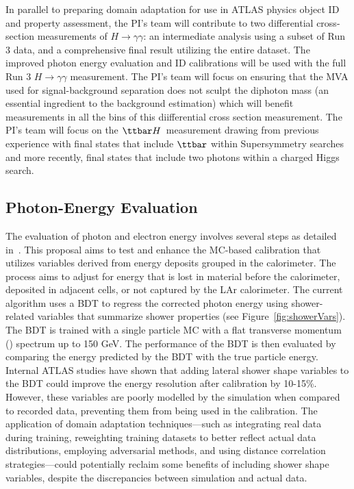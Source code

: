 \documentclass[letter, USenglish, 11pt, subfigure]{article}
\newcommand{\tth}{\ensuremath{\ttbar H}}
\begin{document}
In parallel to preparing domain adaptation for use in ATLAS physics object ID and property assessment, the PI's team will contribute to two differential cross-section measurements of $H\to\gamma\gamma$: an intermediate analysis using a subset of Run 3 data, and a comprehensive final result utilizing the entire dataset. The improved photon energy evaluation and ID calibrations will be used with the full Run 3 $H\to\gamma\gamma$ measurement. The PI's team will focus on ensuring that the MVA used for signal-background separation does not sculpt the diphoton mass (an essential ingredient to the background estimation) which will benefit measurements in all the bins of this diifferential cross section measurement. The PI's team will focus on the \tth\ measurement drawing from previous experience with final states that include $\ttbar$ within Supersymmetry searches and more recently, final states that include two photons within a charged Higgs search. 


\subsection{Photon-Energy Evaluation}

The evaluation of photon and electron energy involves several steps as detailed in~\cite{atlascollaboration2023electron}. This proposal aims to test and enhance the MC-based calibration that utilizes variables derived from energy deposits grouped in the calorimeter. The process aims to adjust for energy that is lost in material before the calorimeter, deposited in adjacent cells, or not captured by the LAr calorimeter. The current algorithm uses a BDT to regress the corrected photon energy using shower-related variables that summarize shower properties (see Figure~\ref{fig:showerVars}). The BDT is trained with a single particle MC with a flat transverse momentum (\pt) spectrum up to 150 GeV. The performance of the BDT is then evaluated by comparing the energy predicted by the BDT with the true particle energy. Internal ATLAS studies have shown that adding lateral shower shape variables to the BDT could improve the energy resolution after calibration by 10-15\%. However, these variables are poorly modelled by the simulation when compared to recorded data, preventing them from being used in the calibration. The application of domain adaptation techniques—such as integrating real data during training, reweighting training datasets to better reflect actual data distributions, employing adversarial methods, and using distance correlation strategies—could potentially reclaim some benefits of including shower shape variables, despite the discrepancies between simulation and actual data.
\end{document}

